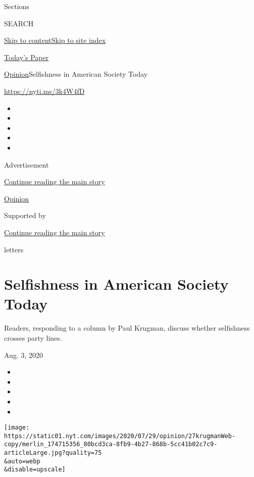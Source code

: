 Sections

SEARCH

\protect\hyperlink{site-content}{Skip to
content}\protect\hyperlink{site-index}{Skip to site index}

\href{https://myaccount.nytimes.com/auth/login?response_type=cookie\&client_id=vi}{}

\href{https://www.nytimes.com/section/todayspaper}{Today's Paper}

\href{/section/opinion}{Opinion}\textbar{}Selfishness in American
Society Today

\href{https://nyti.ms/3k4W4fD}{https://nyti.ms/3k4W4fD}

\begin{itemize}
\item
\item
\item
\item
\item
\end{itemize}

Advertisement

\protect\hyperlink{after-top}{Continue reading the main story}

\href{/section/opinion}{Opinion}

Supported by

\protect\hyperlink{after-sponsor}{Continue reading the main story}

letters

\hypertarget{selfishness-in-american-society-today}{%
\section{Selfishness in American Society
Today}\label{selfishness-in-american-society-today}}

Readers, responding to a column by Paul Krugman, discuss whether
selfishness crosses party lines.

Aug. 3, 2020

\begin{itemize}
\item
\item
\item
\item
\item
\end{itemize}

\texttt{[image: https://static01.nyt.com/images/2020/07/29/opinion/27krugmanWeb-copy/merlin\_174715356\_80bcd3ca-8fb9-4b27-868b-5cc41b02c7c9-articleLarge.jpg?quality=75\\\&auto=webp\\\&disable=upscale]}

